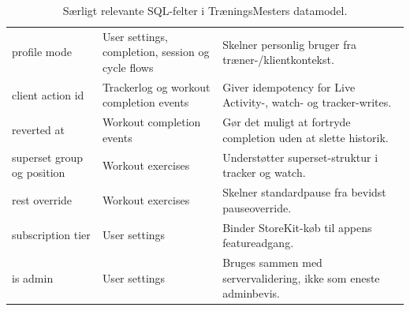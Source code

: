 \begin{table}[htbp]
\small
\renewcommand{\arraystretch}{1.15}
\begin{tabularx}{\textwidth}{>{\RaggedRight\arraybackslash}p{} >{\RaggedRight\arraybackslash}p{} Y}
\toprule
{} &  &  \\
\midrule
profile mode & User settings, completion, session og cycle flows & Skelner personlig bruger fra træner-/klientkontekst. \\
client action id & Trackerlog og workout completion events & Giver idempotency for Live Activity-, watch- og tracker-writes. \\
reverted at & Workout completion events & Gør det muligt at fortryde completion uden at slette historik. \\
superset group og position & Workout exercises & Understøtter superset-struktur i tracker og watch. \\
rest override & Workout exercises & Skelner standardpause fra bevidst pauseoverride. \\
subscription tier & User settings & Binder StoreKit-køb til appens featureadgang. \\
is admin & User settings & Bruges sammen med servervalidering, ikke som eneste adminbevis. \\
\bottomrule
\end{tabularx}
\caption{Særligt relevante SQL-felter i TræningsMesters datamodel.}
\label{tab:tm-sql-fields}
\end{table}

